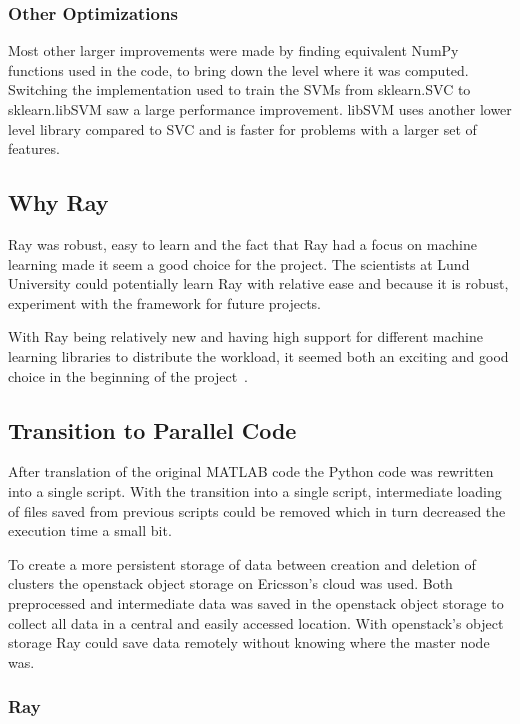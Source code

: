 \documentclass[12pt, a4paper]{article}
\begin{document}
\subsubsection{Other Optimizations}

Most other larger improvements were made by finding equivalent NumPy functions used in the code, to bring down the level where it was computed.
Switching the implementation used to train the SVMs from sklearn.SVC to sklearn.libSVM saw a large performance improvement.
libSVM uses another lower level library compared to SVC and is faster for problems with a larger set of features.

\subsection{Why Ray}

Ray was robust, easy to learn and the fact that Ray had a focus on machine learning made it seem a good choice for the project.
The scientists at Lund University could potentially learn Ray with relative ease and because it is robust, experiment with the framework for future projects.

With Ray being relatively new and having high support for different machine learning libraries to distribute the workload, it seemed both an exciting and good choice in the beginning of the project~\cite{ray:RaySGD, ray:Rayrllib, ray:RayTune, ray:RaySklearn}. 

\subsection{Transition to Parallel Code}
After translation of the original MATLAB code the Python code was
rewritten into a single script.
With the transition into a single script, intermediate loading of files saved from previous scripts could be removed which in turn decreased the execution time a small bit.

To create a more persistent storage of data between creation and deletion of clusters the openstack object storage on Ericsson's cloud was used.
Both preprocessed and intermediate data was saved in the openstack object storage to collect all data in a central and easily accessed location.
With openstack's object storage Ray could save data remotely without knowing where the master node was.

\subsubsection{Ray}
\end{document}
